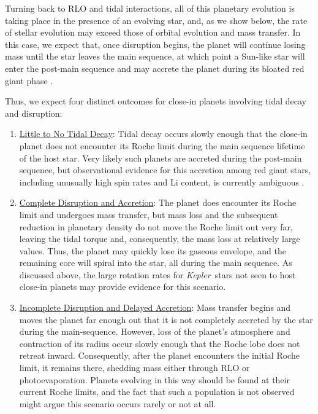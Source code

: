 \documentclass{svjour3}                     %
\newcommand{\kepler}{\emph{Kepler}}
\begin{document}
Turning back to RLO and tidal interactions, all of this planetary evolution is taking place in the presence of an evolving star, and, as we show below, the rate of stellar evolution may exceed those of orbital evolution and mass transfer. In this case, we expect that, once disruption begins, the planet will continue losing mass until the star leaves the main sequence, at which point a Sun-like star will enter the post-main sequence and may accrete the planet during its bloated red giant phase \cite{2009ApJ...700..832C}.

Thus, we expect four distinct outcomes for close-in planets involving tidal decay and disruption:
\begin{enumerate}
\item \underline{Little to No Tidal Decay}: Tidal decay occurs slowly enough that the close-in planet does not encounter its Roche limit during the main sequence lifetime of the host star. Very likely such planets are accreted during the post-main sequence, but observational evidence for this accretion among red giant stars, including unusually high spin rates and Li content, is currently ambiguous \cite{2012ApJ...757..109C}.

\item \underline{Complete Disruption and Accretion}: The planet does encounter its Roche limit and undergoes mass transfer, but mass loss and the subsequent reduction in planetary density do not move the Roche limit out very far, leaving the tidal torque and, consequently, the mass loss at relatively large values. Thus, the planet may quickly lose its gaseous envelope, and the remaining core will spiral into the star, all during the main sequence. As discussed above, the large rotation rates for \kepler\ stars not seen to host close-in planets \cite{2013ApJ...775L..11M} may provide evidence for this scenario.

\item \underline{Incomplete Disruption and Delayed Accretion}: Mass transfer begins and moves the planet far enough out that it is not completely accreted by the star during the main-sequence. However, loss of the planet's atmosphere and contraction of its radius occur slowly enough that the Roche lobe does not retreat inward. Consequently, after the planet encounters the initial Roche limit, it remains there, shedding mass either through RLO or photoevaporation. Planets evolving in this way should be found at their current Roche limits, and the fact that such a population is not observed might argue this scenario occurs rarely or not at all.


\end{enumerate}
\end{document}

